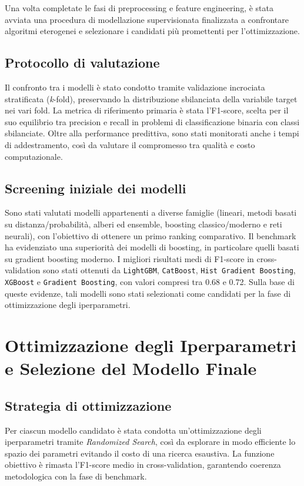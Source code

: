 \documentclass[a4paper,11pt]{article}
\begin{document}
Una volta completate le fasi di preprocessing e feature engineering, è stata avviata una procedura di modellazione supervisionata finalizzata a confrontare algoritmi eterogenei e selezionare i candidati più promettenti per l’ottimizzazione. 

\subsection{Protocollo di valutazione}
Il confronto tra i modelli è stato condotto tramite validazione incrociata stratificata (\textit{k}-fold), preservando la distribuzione sbilanciata della variabile target nei vari fold. 
La metrica di riferimento primaria è stata l’F1-score, scelta per il suo equilibrio tra precision e recall in problemi di classificazione binaria con classi sbilanciate. 
Oltre alla performance predittiva, sono stati monitorati anche i tempi di addestramento, così da valutare il compromesso tra qualità e costo computazionale. 

\subsection{Screening iniziale dei modelli}
Sono stati valutati modelli appartenenti a diverse famiglie (lineari, metodi basati su distanza/probabilità, alberi ed ensemble, boosting classico/moderno e reti neurali), con l’obiettivo di ottenere un primo ranking comparativo. 
Il benchmark ha evidenziato una superiorità dei modelli di boosting, in particolare quelli basati su gradient boosting moderno. 
I migliori risultati medi di F1-score in cross-validation sono stati ottenuti da \texttt{LightGBM}, \texttt{CatBoost}, \texttt{Hist Gradient Boosting}, \texttt{XGBoost} e \texttt{Gradient Boosting}, con valori compresi tra 0.68 e 0.72. 
Sulla base di queste evidenze, tali modelli sono stati selezionati come candidati per la fase di ottimizzazione degli iperparametri. 

\newpage
\section{Ottimizzazione degli Iperparametri e Selezione del Modello Finale}

\subsection{Strategia di ottimizzazione}
Per ciascun modello candidato è stata condotta un’ottimizzazione degli iperparametri tramite \textit{Randomized Search}, così da esplorare in modo efficiente lo spazio dei parametri evitando il costo di una ricerca esaustiva. 
La funzione obiettivo è rimasta l’F1-score medio in cross-validation, garantendo coerenza metodologica con la fase di benchmark. 
\end{document}
